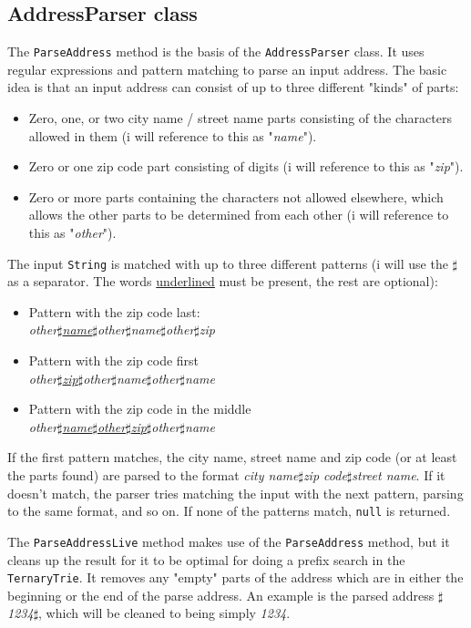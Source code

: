 \documentclass[a4paper,11pt]{article}
\begin{document}
\subsection{AddressParser class}
The \texttt{ParseAddress} method is the basis of the \texttt{AddressParser} class. It uses regular expressions and pattern matching to parse an input address. The basic idea is that an input address can consist of up to three different "kinds" of parts:
\begin{itemize}
	\item Zero, one, or two city name / street name parts consisting of the characters allowed in them (i will reference to this as "\textit{name}").
	\item Zero or one zip code part consisting of digits (i will reference to this as "\textit{zip}").
	\item Zero or more parts containing the characters not allowed elsewhere, which allows the other parts to be determined from each other (i will reference to this as "\textit{other}").
\end{itemize}
The input \texttt{String} is matched with up to three different patterns (i will use the $\sharp$ as a separator. The words \underline{underlined} must be present, the rest are optional):
\begin{itemize}
	\item Pattern with the zip code last: \\
		\textit{other$\sharp$\underline{name}$\sharp$other$\sharp$name$\sharp$other$\sharp$zip}
	\item Pattern with the zip code first \\
	\textit{other$\sharp$\underline{zip}$\sharp$other$\sharp$name$\sharp$other$\sharp$name}
	\item Pattern with the zip code in the middle \\
	\textit{other$\sharp$\underline{name$\sharp$other$\sharp$zip}$\sharp$other$\sharp$name}
\end{itemize}
If the first pattern matches, the city name, street name and zip code (or at least the parts found) are parsed to the format \textit{city name$\sharp$zip code$\sharp$street name}. If it doesn't match, the parser tries matching the input with the next pattern, parsing to the same format, and so on. If none of the patterns match, \texttt{null} is returned.

The \texttt{ParseAddressLive} method makes use of the \texttt{ParseAddress} method, but it cleans up the result for it to be optimal for doing a prefix search in the \texttt{TernaryTrie}. It removes any "empty" parts of the address which are in either the beginning or the end of the parse address. An example is the parsed address \textit{$\sharp$1234$\sharp$}, which will be cleaned to being simply \textit{1234}.
\end{document}
